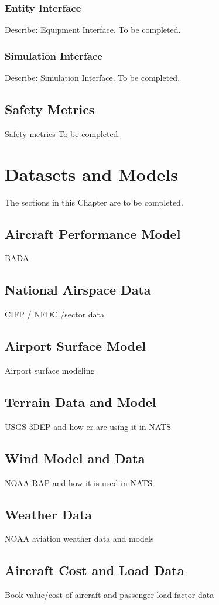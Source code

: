 \documentclass[11pt]{book}              %
\begin{document}
\subsection{Entity Interface}
Describe: Equipment Interface. {\color{red}To be completed.}
\subsection{Simulation Interface}
Describe: Simulation Interface. {\color{red}To be completed.}
\section{Safety Metrics}
Safety metrics {\color{red}To be completed.}
\chapter{Datasets and Models}
{\color{red}The sections in this Chapter are to be completed.}
\section{Aircraft Performance Model}
BADA 
\section{National Airspace Data}
CIFP / NFDC /sector data
\section{Airport Surface Model}
Airport surface modeling 
\section{Terrain Data and Model}
USGS 3DEP and how er are using it in NATS
\section{Wind Model and Data}
NOAA RAP and how it is used in NATS
\section{Weather Data}
NOAA aviation weather data and models
\section{Aircraft Cost and Load Data}
Book value/cost of aircraft and passenger load factor data
\end{document}
